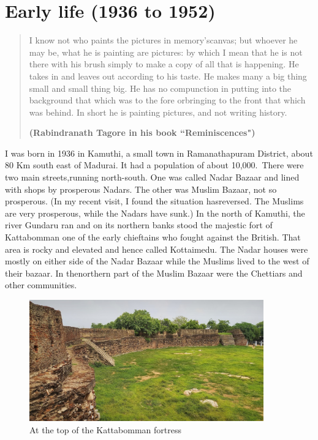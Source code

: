 \chapter{Early life (1936 to 1952)}

\begin{quote}
I know not who paints the pictures in memory's\break canvas; but whoever
he may be, what he is painting are pictures: by which I mean that 
he is not there with his brush simply to make a copy of all that is
happe\-ning. He takes in and leaves out according to his taste. He
makes many a big thing small and small thing big. He has no compunction 
in putting into the background that which was to the fore or\break bringing
to the front that which was behind. In short he is painting pictures, 
and not writing history.

\hfill {\small{\bf{(Rabindranath Tagore in his book ``Reminiscences")}}}
\end{quote}

I was born in 1936 in Kamuthi, a small town in Ramanatha\-puram District, 
about 80 Km south east of Madurai. It had a popula\-tion of about 10,000.\ 
There were two main streets,\break running north-south. One was called Nadar 
Bazaar and lined with shops by prosperous Nadars. The other was Muslim 
Bazaar, not so prosperous. (In my recent visit, I found the situation 
has\break reversed. The Muslims are very prosperous, while the Nadars have 
sunk.) In the north of Kamuthi, the river Gundaru ran and on its 
northern banks stood the majestic fort of Kattabomman one of the early 
chieftains who fought against the British. That area is rocky and 
elevated and hence called Kottaimedu. The Nadar houses were mostly on 
either side of the Nadar Bazaar while the Muslims lived to the west of 
their bazaar. In the\break northern part of the Muslim Bazaar were the 
Chettiars and other communities.


\begin{figure}[H]
\centering
\includegraphics[width=0.9\textwidth]{images/new-images/01-Rajaji-fort.jpg}
\caption{At the top of the Kattabomman fortress}
\end{figure}

